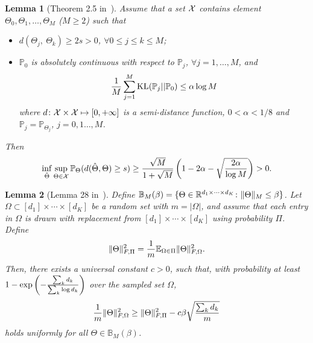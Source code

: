 \documentclass{article}
\theoremstyle{plain}
\newtheorem{lem}{Lemma}
\theoremstyle{definition}
\begin{document}
\begin{lem}[Theorem 2.5 in~\citet{tsybakov2008introduction}]\label{lem:Tsybakov}
Assume that a set $\mathcal{X}$ contains element $\Theta_0, \Theta_1, \ldots,\Theta_M$ ($M\geq 2$) such that
\begin{itemize}
\item $d(\Theta_j,\ \Theta_k)\geq 2s>0$, $\forall 0\leq j\leq k\leq M$;
\item $\mathbb{P}_0$ is absolutely continuous with respect to $\mathbb{P}_j$, $\forall j=1,\ldots,M$, and
\[
{1\over M}\sum_{j=1}^M \mathrm{KL}(\mathbb{P}_j||\mathbb{P}_0)\leq \alpha \log M
\]
where $d\colon \mathcal{X}\times \mathcal{X}\mapsto [0,+\infty]$ is a semi-distance function, $0<\alpha<{1/8}$ and $\mathbb{P}_j=\mathbb{P}_{\Theta_j}$, $j=0,1\ldots,M$.
\end{itemize}
Then
\[
\inf_{\hat \Theta}\sup_{\Theta\in\mathcal{X}} \mathbb{P}_{\Theta}(d(\hat \Theta, \Theta)\geq s)\geq {\sqrt{M}\over 1+\sqrt{M}}\left(1-2\alpha-\sqrt{2\alpha\over \log M} \right)>0.
\]
\end{lem}

\begin{lem}[Lemma 28 in~\citet{ghadermarzy2019near}]\label{lem:convexity}
Define $\mathbb{B}_{M}(\beta)=\{\Theta\in \mathbb{R}^{d_1\times \cdots \times d_K}\colon \lVert\Theta\rVert_M\leq \beta \}$.  Let $\Omega\subset[d_1]\times\cdots \times [d_K]$ be a random set with $m=|\Omega|$, and assume that each entry in $\Omega$ is drawn with replacement from $[d_1]\times\cdots\times[d_K]$ using probability $\Pi$. Define
\[
\lVert\Theta\rVert_{F,\Pi}^2={1\over m}\mathbb{E}_{\Omega\in\Pi}\lVert\Theta\rVert_{F,\Omega}^2.
\]
Then, there exists a universal constant $c>0$, such that, with probability at least $1-\exp\left(-{\sum_kd_k \over \sum_k \log d_k} \right)$ over the sampled set $\Omega$,
\[
{1\over m}\lVert\Theta\rVert_{F,\Omega}^2 \geq \lVert\Theta\rVert_{F,\Pi}^2-c\beta\sqrt{\sum_k d_k\over m}
\]
holds uniformly for all $\Theta\in\mathbb{B}_M(\beta)$.
\end{lem}
\end{document}
